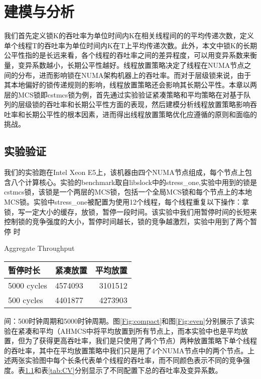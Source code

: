 
\chapter{建模与分析}
\label{chap:example}
我们首先定义锁K的吞吐率为单位时间内K在相关线程间的的平均传递次数，定义单个线程T的吞吐率为单位时间内K在T上平均传递次数。此外，本文中锁K的长期公平性指的是长远来看，各个线程的吞吐率之间的差异程度，可以用变异系数来衡量，变异系数越小，长期公平性越好。线程放置策略决定了线程在NUMA节点之间的分布，进而影响锁在NUMA架构机器上的吞吐率。而对于层级锁来说，由于其本地偏好的锁传递规则的影响，线程放置策略还会影响其长期公平性。本章以两层的MCS锁即cstmcs锁为例，首先通过实验验证紧凑策略和平均策略在对基于队列的层级锁的吞吐率和长期公平性方面的表现，然后建模分析线程放置策略影响吞吐率和长期公平性的根本因素，进而得出线程放置策略优化应遵循的原则和面临的挑战。

\section{实验验证}
我们的实验跑在Intel Xeon E5上，该机器由四个NUMA节点组成，每个节点上包含八个计算核心。实验的benchmark取自libslock中的stress\_one,实验中用到的锁是cstmcs锁，该锁是一个两层的MCS锁，包括一个全局MCS锁和每个节点上的本地MCS锁。实验中stress\_one被配置为使用12个线程，每个线程重复以下操作：拿锁，写一定大小的缓存，放锁，暂停一段时间。该实验中我们用暂停时间的长短来控制锁的竞争强度的大小，暂停时间越长，锁的竞争越激烈，实验中用到了两个暂停
时\begin{table}[!hpb]
  \centering
    {Aggregate Throughput}
  \label{tab:aggregate}
  \begin{tabular}{@{}llr@{}} \toprule
    暂停时长 & 紧凑放置 & 平均放置\\ \midrule
    5000 cycles & 4574093 & 3101512 \\
    500  cycles & 4401877 & 4273903\\
  \end{tabular}
\end{table}
间：500时钟周期和5000时钟周期。图\ref{Fig:compact}和图\ref{Fig:even}分别展示了该实验在紧凑和平均（AHMCS中将平均放置到所有节点上，而本实验中也是平均放置，但为了获得更高吞吐率，我们是只使用了两个节点）两种放置策略下单个线程的吞吐率，其中在平均放置策略中我们只是用了4个NUMA节点中的两个节点。上述两张实验图中每个长条代表单个线程的吞吐率，而不同颜色表示不同的竞争强度。表\ref{tab:aggregate}和表\ref{tab:CV}分别显示了不同配置下总的吞吐率及变异系数。

